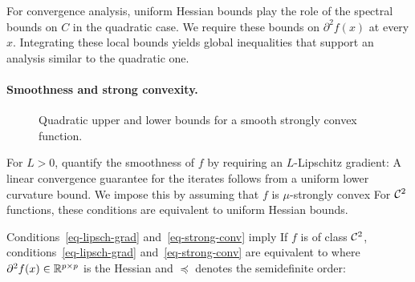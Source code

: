 For convergence analysis, uniform Hessian bounds play the role of the spectral bounds on $C$ in the quadratic case. We require these bounds on $\partial^2 f(x)$ at every $x$.
%
Integrating these local bounds yields global inequalities that support an analysis similar to the quadratic one.


\paragraph{Smoothness and strong convexity.}

\begin{figure}[tbp]
\centering
{}
\caption{Quadratic upper and lower bounds for a smooth strongly convex function.}
\label{fig-review-smooth-curvature-bounds}
\end{figure}
For $L>0$, quantify the smoothness of $f$ by requiring an $L$-Lipschitz gradient:
A linear convergence guarantee for the iterates follows from a uniform lower curvature bound. We impose this by assuming that $f$ is $\mu$-strongly convex
For $\mathcal{C}^2$ functions, these conditions are equivalent to uniform Hessian bounds.

\begin{prop}\label{prop-smooth-strong}
Conditions~\eqref{eq-lipsch-grad} and~\eqref{eq-strong-conv} imply
If $f$ is of class $\mathcal{C}^2$, conditions~\eqref{eq-lipsch-grad} and~\eqref{eq-strong-conv} are equivalent to
where $\partial^2 f(x)\in\mathbb{R}^{p\times p}$ is the Hessian and $\preceq$ denotes the semidefinite order:
\end{prop}

